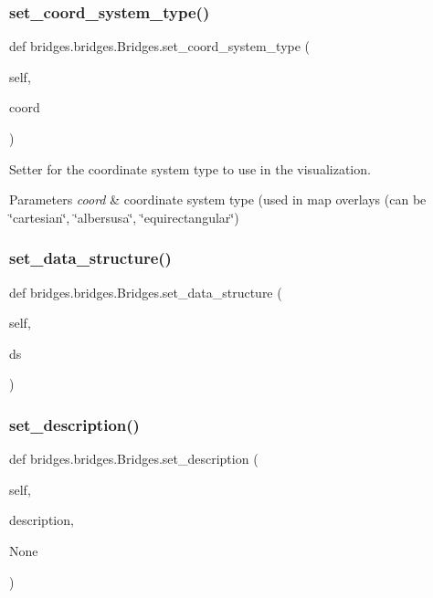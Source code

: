 \subsubsection{\texorpdfstring{set\+\_\+coord\+\_\+system\+\_\+type()}{set\_coord\_system\_type()}}
{\footnotesize\ttfamily def bridges.\+bridges.\+Bridges.\+set\+\_\+coord\+\_\+system\+\_\+type (\begin{DoxyParamCaption}\item[{}]{self,  }\item[{}]{coord }\end{DoxyParamCaption})}



Setter for the coordinate system type to use in the visualization. 


\begin{DoxyParams}{Parameters}
{\em coord} & coordinate system type (used in map overlays (can be \char`\"{}cartesian\char`\"{}, \char`\"{}albersusa\char`\"{}, \char`\"{}equirectangular\char`\"{}) \\
\hline
\end{DoxyParams}
\mbox{\label{classbridges_1_1bridges_1_1_bridges_a868f02fa66c87c1a1fc7bd6fbc799291}} 
\subsubsection{\texorpdfstring{set\+\_\+data\+\_\+structure()}{set\_data\_structure()}}
{\footnotesize\ttfamily def bridges.\+bridges.\+Bridges.\+set\+\_\+data\+\_\+structure (\begin{DoxyParamCaption}\item[{}]{self,  }\item[{}]{ds }\end{DoxyParamCaption})}

\mbox{\label{classbridges_1_1bridges_1_1_bridges_aba86088c031b505bbe88dbc530bf1331}} 
\subsubsection{\texorpdfstring{set\+\_\+description()}{set\_description()}}
{\footnotesize\ttfamily def bridges.\+bridges.\+Bridges.\+set\+\_\+description (\begin{DoxyParamCaption}\item[{}]{self,  }\item[{}]{description,  }\item[{}]{None }\end{DoxyParamCaption})}



